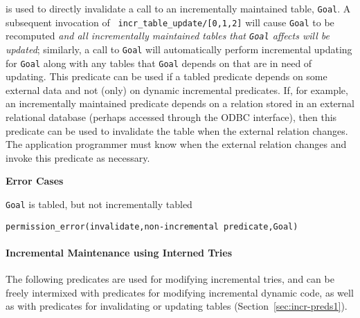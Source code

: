 \begin{description}
is used to directly invalidate a call to an incrementally maintained
table, {\tt Goal}.  A subsequent invocation of {\tt
  incr\_table\_update/[0,1,2]} will cause {\tt Goal} to be recomputed
{\em and all incrementally maintained tables that {\tt Goal} affects
  will be updated}; similarly, a call to {\tt Goal} will automatically
perform incremental updating for {\tt Goal} along with any tables that
{\tt Goal} depends on that are in need of updating.  This predicate can
be used if a tabled predicate depends on some external data and not
(only) on dynamic incremental predicates.  If, for example, an
incrementally maintained predicate depends on a relation stored in an
external relational database (perhaps accessed through the ODBC
interface), then this predicate can be used to invalidate the table
when the external relation changes.  The application programmer must
know when the external relation changes and invoke this predicate as
necessary.

{\bf Error Cases}
\bi
\item 	{\tt Goal} is tabled, but not incrementally tabled
\bi
\item 	{\tt permission\_error(invalidate,non-incremental predicate,Goal)}
\ei
\ei

\end{description}

\paragraph{Incremental Maintenance using Interned Tries}
The following predicates are used for modifying incremental tries, and
can be freely intermixed with predicates for modifying incremental
dynamic code, as well as with predicates for invalidating or updating
tables (Section~\ref{sec:incr-preds1}).

